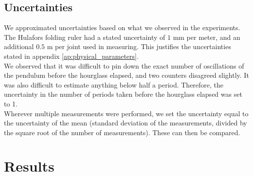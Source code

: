 \documentclass[a4paper, 10pt]{article}
\begin{document}
\subsection{Uncertainties}
We approximated uncertainties based on what we observed in the experiments.\\
\linebreak
The Hulafors folding ruler had a stated uncertainty of $1$ mm per meter, and an additional $0.5$ m per joint used in measuring. This justifies the uncertainties stated in appendix \ref{ap:physical_parameters}.
\\
\linebreak
We observed that it was difficult to pin down the exact number of oscillations of the pendulum before the hourglass elapsed, and two counters disagreed slightly. It was also difficult to estimate anything below half a period. Therefore, the uncertainty in the number of periods taken before the hourglass elapsed was set to 1.\\
\linebreak
Wherever multiple measurements were performed, we set the uncertainty equal to the uncertainty of the mean (standard deviation of the measurements, divided by the square root of the number of measurements). These can then be compared.
\section{Results}
\end{document}
